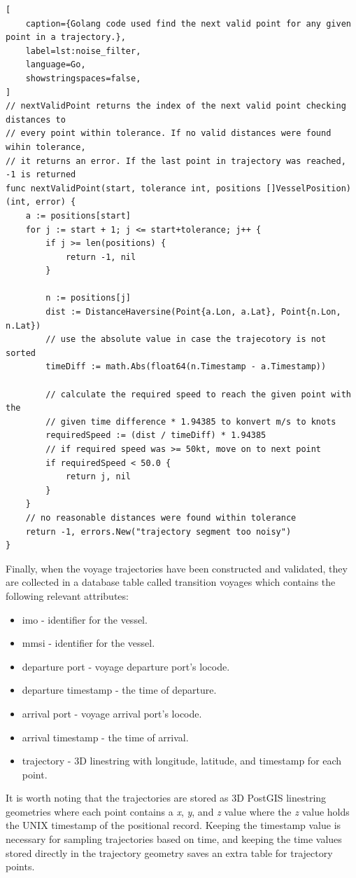 \begin{lstlisting}[
    caption={Golang code used find the next valid point for any given point in a trajectory.},
    label=lst:noise_filter,
    language=Go,
    showstringspaces=false,
]
// nextValidPoint returns the index of the next valid point checking distances to
// every point within tolerance. If no valid distances were found wihin tolerance,
// it returns an error. If the last point in trajectory was reached, -1 is returned
func nextValidPoint(start, tolerance int, positions []VesselPosition) (int, error) {
	a := positions[start]
	for j := start + 1; j <= start+tolerance; j++ {
		if j >= len(positions) {
			return -1, nil
		}

		n := positions[j]
		dist := DistanceHaversine(Point{a.Lon, a.Lat}, Point{n.Lon, n.Lat})
		// use the absolute value in case the trajecotory is not sorted
		timeDiff := math.Abs(float64(n.Timestamp - a.Timestamp))

		// calculate the required speed to reach the given point with the
		// given time difference * 1.94385 to konvert m/s to knots
		requiredSpeed := (dist / timeDiff) * 1.94385
		// if required speed was >= 50kt, move on to next point
		if requiredSpeed < 50.0 {
			return j, nil
		}
	}
	// no reasonable distances were found within tolerance
	return -1, errors.New("trajectory segment too noisy")
}
\end{lstlisting}

Finally, when the voyage trajectories have been constructed and validated, they are collected in a database table called transition voyages which contains the following relevant attributes:

\begin{itemize}
    \item imo - identifier for the vessel.
    \item mmsi - identifier for the vessel.
    \item departure port - voyage departure port's locode.
    \item departure timestamp - the time of departure.
    \item arrival port - voyage arrival port's locode.
    \item arrival timestamp - the time of arrival.
    \item trajectory - 3D linestring with longitude, latitude, and timestamp for each point.
\end{itemize}

It is worth noting that the trajectories are stored as 3D PostGIS linestring geometries where each point contains a \textit{x}, \textit{y}, and \textit{z} value where the \textit{z} value holds the UNIX timestamp of the positional record. Keeping the timestamp value is necessary for sampling trajectories based on time, and keeping the time values stored directly in the trajectory geometry saves an extra table for trajectory points.

